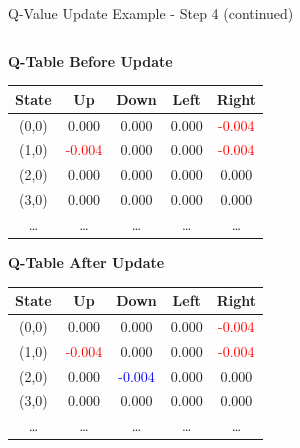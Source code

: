 \documentclass[aspectratio=169]{beamer}
\begin{document}
\begin{frame}{Q-Value Update Example - Step 4 (continued)}
    
    \begin{columns}
        \begin{column}{0.5\textwidth}
            \textbf{Q-Table Before Update}
            \small
            \begin{table}[h]
                \centering
                \begin{tabular}{|c|c|c|c|c|}
                    \hline
                    \textbf{State} & \textbf{Up} & \textbf{Down} & \textbf{Left} & \textbf{Right} \\
                    \hline
                    (0,0) & 0.000 & 0.000 & 0.000 & \textcolor{red}{-0.004} \\
                    (1,0) & \textcolor{red}{-0.004} & 0.000 & 0.000 & \textcolor{red}{-0.004} \\
                    (2,0) & 0.000 & 0.000 & 0.000 & 0.000 \\
                    (3,0) & 0.000 & 0.000 & 0.000 & 0.000 \\
                    \dots & \dots & \dots & \dots & \dots \\
                    \hline
                \end{tabular}
            \end{table}
            
            \textbf{Q-Table After Update}
            \small
            \begin{table}[h]
                \centering
                \begin{tabular}{|c|c|c|c|c|}
                    \hline
                    \textbf{State} & \textbf{Up} & \textbf{Down} & \textbf{Left} & \textbf{Right} \\
                    \hline
                    (0,0) & 0.000 & 0.000 & 0.000 & \textcolor{red}{-0.004} \\
                    (1,0) & \textcolor{red}{-0.004} & 0.000 & 0.000 & \textcolor{red}{-0.004} \\
                    (2,0) & 0.000 & \textcolor{blue}{-0.004} & 0.000 & 0.000 \\
                    (3,0) & 0.000 & 0.000 & 0.000 & 0.000 \\
                    \dots & \dots & \dots & \dots & \dots \\
                    \hline
                \end{tabular}
            \end{table}
        \end{column}
        

\end{columns}
\end{frame}
\end{document}
